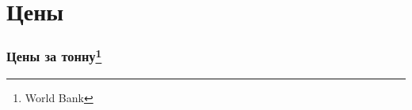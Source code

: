 \section{Цены}

\begin{frame}[fragile]
    \frametitle{Цены за тонну\footnote{World Bank}}
    \begin{center}
    
    \end{center}
\end{frame}